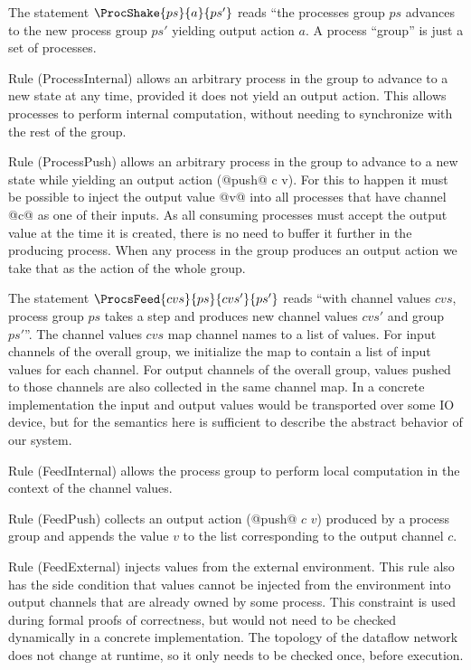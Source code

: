 The statement $\ProcShake{ps}{a}{ps'}$ reads ``the processes group $ps$ advances to the new process group $ps'$ yielding output action $a$. A process ``group'' is just a set of processes. 


Rule (ProcessInternal) allows an arbitrary process in the group to advance to a new state at any time, provided it does not yield an output action. This allows processes to perform internal computation, without needing to synchronize with the rest of the group.

Rule (ProcessPush) allows an arbitrary process in the group to advance to a new state while yielding an output action (@push@ c v). For this to happen it must be possible to inject the output value @v@ into all processes that have channel @c@ as one of their inputs. As all consuming processes must accept the output value at the time it is created, there is no need to buffer it further in the producing process. When any process in the group produces an output action we take that as the action of the whole group.

\smallskip
The statement $\ProcsFeed{cvs}{ps}{cvs'}{ps'}$ reads ``with channel values $cvs$, process group $ps$ takes a step and produces new channel values $cvs'$ and group $ps'$''. The channel values $cvs$ map channel names to a list of values. For input channels of the overall group, we initialize the map to contain a list of input values for each channel. For output channels of the overall group, values pushed to those channels are also collected in the same channel map. In a concrete implementation the input and output values would be transported over some IO device, but for the semantics here is sufficient to describe the abstract behavior of our system.

Rule (FeedInternal) allows the process group to perform local computation in the context of the channel values. 

Rule (FeedPush) collects an output action (@push@ $c$ $v$) produced by a process group and appends the value $v$ to the list corresponding to the output channel $c$. 

Rule (FeedExternal) injects values from the external environment. This rule also has the side condition that values cannot be injected from the environment into output channels that are already owned by some process. This constraint is used during formal proofs of correctness, but would not need to be checked dynamically in a concrete implementation. The topology of the dataflow network does not change at runtime, so it only needs to be checked once, before execution.


